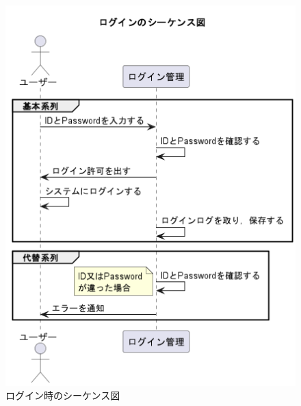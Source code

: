 \documentclass[documentclass]{jsarticle}
\begin{document}
\begin{figure}[H]
  \centering
  \begin{minipage}[b]{0.49\columnwidth}
      \centering
      \includegraphics[width=0.8\columnwidth]{figure/6-1.png}
      \caption{ログイン時のシーケンス図}
      \label{fig:6-1}
  \end{minipage}
  \begin{minipage}[b]{0.49\columnwidth}
      \centering

\end{minipage}
\end{figure}
\end{document}
